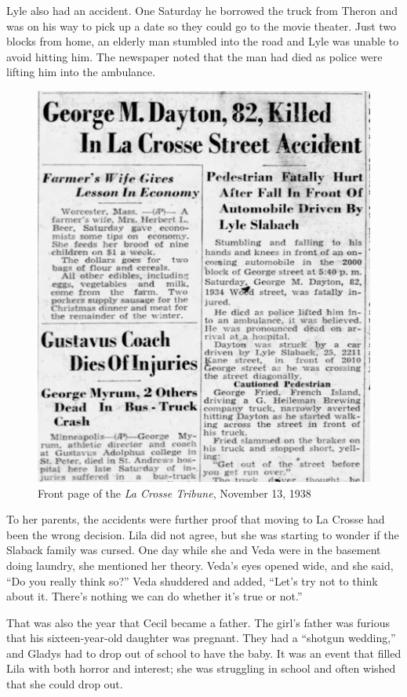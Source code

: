 \documentclass[
  letterpaper,
]{book}
\begin{document}
Lyle also had an accident. One Saturday he borrowed the truck from
Theron and was on his way to pick up a date so they could go to the
movie theater. Just two blocks from home, an elderly man stumbled into
the road and Lyle was unable to avoid hitting him. The newspaper noted
that the man had died as police were lifting him into the ambulance.

\begin{figure}[H]

{\centering \includegraphics[width=0.8\linewidth,height=\textheight,keepaspectratio]{images/Akou09.jpg}

}

\caption{Front page of the \emph{La Crosse Tribune}, November 13, 1938}

\end{figure}%

To her parents, the accidents were further proof that moving to La
Crosse had been the wrong decision. Lila did not agree, but she was
starting to wonder if the Slaback family was cursed. One day while she
and Veda were in the basement doing laundry, she mentioned her theory.
Veda's eyes opened wide, and she said, ``Do you really think so?'' Veda
shuddered and added, ``Let's try not to think about it. There's nothing
we can do whether it's true or not.''

That was also the year that Cecil became a father. The girl's father was
furious that his sixteen-year-old daughter was pregnant. They had a
``shotgun wedding,'' and Gladys had to drop out of school to have the
baby. It was an event that filled Lila with both horror and interest;
she was struggling in school and often wished that she could drop out.
\end{document}
